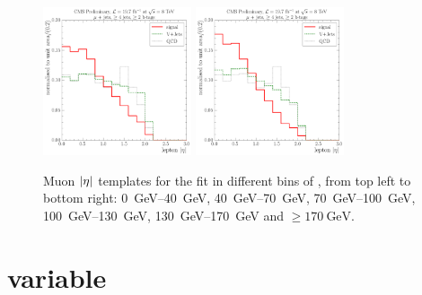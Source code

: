 \begin{figure}[!htbp]
    \hspace*{\fill} \\
    \hspace*{\fill}
    {\includegraphics[width=0.39\textwidth]{measurement/WPT/central/fit_templates/muon_templates_bin_130-170}}\hfill
    {\includegraphics[width=0.39\textwidth]{measurement/WPT/central/fit_templates/muon_templates_bin_170-inf}}
    \hspace*{\fill}
    \caption[Muon $\abs \eta$ templates for the fit in different bins of \WPT]{Muon $\abs \eta$ templates for the fit
    in different bins of \WPT, from top left to bottom right: \SIrange{0}{40}{\GeV}, \SIrange{40}{70}{\GeV},
    \SIrange{70}{100}{\GeV}, \SIrange{100}{130}{\GeV}, \SIrange{130}{170}{\GeV} and $\geq \SI{170}{\GeV}$.}
    \label{fig:fit_templates_WPT_muon}
\end{figure}


\newpage
\section*{\MT variable}

